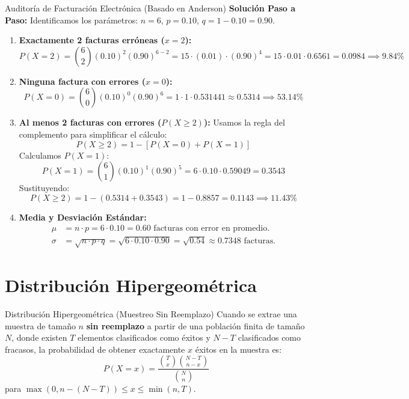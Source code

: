\begin{ejemplo}{Auditoría de Facturación Electrónica (Basado en Anderson)}
\tcbline
\textbf{Solución Paso a Paso:}
Identificamos los parámetros: $n = 6$, $p = 0.10$, $q = 1 - 0.10 = 0.90$.
\begin{enumerate}[label=\alph*)]
    \item \textbf{Exactamente 2 facturas erróneas ($x = 2$):}
    \[
    P(X = 2) = \binom{6}{2} (0.10)^2 (0.90)^{6-2} = 15 \cdot (0.01) \cdot (0.90)^4 = 15 \cdot 0.01 \cdot 0.6561 = 0.0984 \implies 9.84\%
    \]
    \item \textbf{Ninguna factura con errores ($x = 0$):}
    \[
    P(X = 0) = \binom{6}{0} (0.10)^0 (0.90)^6 = 1 \cdot 1 \cdot 0.531441 \approx 0.5314 \implies 53.14\%
    \]
    \item \textbf{Al menos 2 facturas con errores ($P(X \ge 2)$):}
    Usamos la regla del complemento para simplificar el cálculo:
    \[
    P(X \ge 2) = 1 - [P(X = 0) + P(X = 1)]
    \]
    Calculamos $P(X = 1)$:
    \[
    P(X = 1) = \binom{6}{1} (0.10)^1 (0.90)^5 = 6 \cdot 0.10 \cdot 0.59049 = 0.3543
    \]
    Sustituyendo:
    \[
    P(X \ge 2) = 1 - (0.5314 + 0.3543) = 1 - 0.8857 = 0.1143 \implies 11.43\%
    \]
    \item \textbf{Media y Desviación Estándar:}
    \begin{align*}
        \mu &= n \cdot p = 6 \cdot 0.10 = 0.60 \text{ facturas con error en promedio.} \\
        \sigma &= \sqrt{n \cdot p \cdot q} = \sqrt{6 \cdot 0.10 \cdot 0.90} = \sqrt{0.54} \approx 0.7348 \text{ facturas.}
    \end{align*}
\end{enumerate}
\end{ejemplo}

\section{Distribución Hipergeométrica}
\begin{definicion}{Distribución Hipergeométrica (Muestreo Sin Reemplazo)}
Cuando se extrae una muestra de tamaño $n$ \textbf{sin reemplazo} a partir de una población finita de tamaño $N$, donde existen $T$ elementos clasificados como éxitos y $N-T$ clasificados como fracasos, la probabilidad de obtener exactamente $x$ éxitos en la muestra es:
\begin{equation}
    P(X = x) = \frac{\binom{T}{x} \binom{N-T}{n-x}}{\binom{N}{n}}
\end{equation}
para $\max(0, n - (N-T)) \le x \le \min(n, T)$.
\end{definicion}

